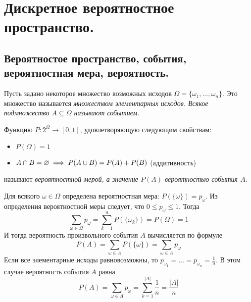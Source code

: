 \section{Дискретное вероятностное пространство.}

\subsection{Вероятностое пространство, события, вероятностная мера, вероятность.}
\begin{definition}
    Пусть задано некоторое множество возможных исходов $\Omega = \{\omega_1, \ldots, \omega_n\}$. Это множество называется
    \it{множеством элементарных исходов}. Всякое подмножество $A \subseteq \Omega$ называют \it{событием}.

    Функцию $P \colon 2^{\Omega} \to [0, 1]$, удовлетворяющую следующим свойствам:
    \begin{itemize}
        \item $P(\Omega) = 1$
        \item $A \cap B = \varnothing \implies P(A \cup B) = P(A) + P(B)$ (аддитивность)
    \end{itemize}
    называют \it{вероятностной мерой}, а значение $P(A)$ \it{вероятностью} события $A$.
\end{definition}
Для всякого $\omega \in \Omega$ определена вероятностная мера: $P(\{ \omega \}) = p_{\omega}$. Из определения вероятностной меры
следует, что $0 \leq p_{\omega} \leq 1$. Тогда
\begin{equation*}
    \sum\limits_{\omega \in \Omega}p_{\omega} = \sum\limits_{k = 1}^{n} P(\{\omega_k\}) = P(\Omega) = 1
\end{equation*}
И тогда вероятность произвольного события $A$ вычисляется по формуле
\begin{equation*}
    P(A) = \sum\limits_{\omega \in A}P(\{\omega\}) = \sum\limits_{\omega \in A}p_{\omega}
\end{equation*}
Если все элементарные исходы равновозможны, то $p_{\omega_1} = \ldots = p_{\omega_n} = \frac{1}{n}$.
В этом случае вероятность события $A$ равна
\begin{equation*}
    P(A) = \sum\limits_{\omega \in A}p_{\omega} = \sum\limits_{k=1}^{|A|} \frac{1}{n} = \frac{|A|}{n}
\end{equation*}
